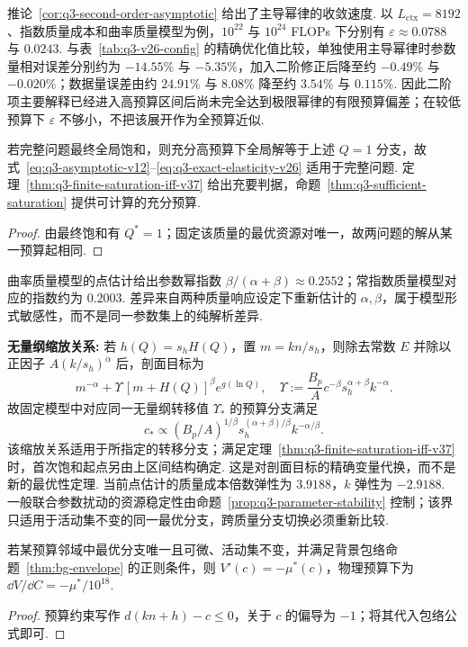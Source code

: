 推论~\ref{cor:q3-second-order-asymptotic} 给出了主导幂律的收敛速度. 以 $L_{\mathrm{ctx}}=8192$、指数质量成本和曲率质量模型为例，$10^{22}$ 与 $10^{24}$ FLOPs 下分别有 $\varepsilon\approx0.0788$ 与 $0.0243$. 与表~\ref{tab:q3-v26-config} 的精确优化值比较，单独使用主导幂律时参数量相对误差分别约为 $-14.55\%$ 与 $-5.35\%$，加入二阶修正后降至约 $-0.49\%$ 与 $-0.020\%$；数据量误差由约 $24.91\%$ 与 $8.08\%$ 降至约 $3.54\%$ 与 $0.115\%$. 因此二阶项主要解释已经进入高预算区间后尚未完全达到极限幂律的有限预算偏差；在较低预算下 $\varepsilon$ 不够小，不把该展开作为全预算近似. 

\begin{corollary}[完整问题的条件渐近]\label{cor:q3-global-asymptotic-v29}
若完整问题最终全局饱和，则充分高预算下全局解等于上述 $Q=1$ 分支，故式~\eqref{eq:q3-asymptotic-v12}--\eqref{eq:q3-exact-elasticity-v26} 适用于完整问题. 定理~\ref{thm:q3-finite-saturation-iff-v37} 给出充要判据，命题~\ref{thm:q3-sufficient-saturation} 提供可计算的充分预算. 
\end{corollary}
\begin{proof}
由最终饱和有 $Q^*=1$；固定该质量的最优资源对唯一，故两问题的解从某一预算起相同. 
\end{proof}
曲率质量模型的点估计给出参数幂指数 $\beta/(\alpha+\beta)\approx0.2552$；常指数质量模型对应的指数约为 $0.2003$. 差异来自两种质量响应设定下重新估计的 $\alpha,\beta$，属于模型形式敏感性，而不是同一参数集上的纯解析差异. 

\textbf{无量纲缩放关系:}
若 $h(Q)=s_hH(Q)$，置 $m=kn/s_h$，则除去常数 $E$ 并除以正因子 $A(k/s_h)^\alpha$ 后，剖面目标为
\begin{equation}\label{eq:q3-dimensionless-scaling}
m^{-\alpha}+\Upsilon\,[m+H(Q)]^\beta e^{g(\ln Q)},
\quad \Upsilon:=\frac{B_p}{A}c^{-\beta}s_h^{\alpha+\beta}k^{-\alpha}.
\end{equation}
故固定模型中对应同一无量纲转移值 $\Upsilon_*$ 的预算分支满足
\[
c_*\propto (B_p/A)^{1/\beta}s_h^{(\alpha+\beta)/\beta}k^{-\alpha/\beta}.
\]
该缩放关系适用于所指定的转移分支；满足定理~\ref{thm:q3-finite-saturation-iff-v37} 时，首次饱和起点另由上区间结构确定. 
这是对剖面目标的精确变量代换，而不是新的最优性定理. 
当前点估计的质量成本倍数弹性为 $3.9188$，$k$ 弹性为 $-2.9188$. 一般联合参数扰动的资源稳定性由命题~\ref{prop:q3-parameter-stability} 控制；该界只适用于活动集不变的同一最优分支，跨质量分支切换必须重新比较. 

\begin{corollary}[最优值的预算灵敏度与影子价格]\label{prop:q3-shadow-price}
若某预算邻域中最优分支唯一且可微、活动集不变，并满足背景包络命题~\ref{thm:bg-envelope} 的正则条件，则 $V'(c)=-\mu^*(c)$，物理预算下为 $\dd V/\dd C=-\mu^*/10^{18}$. 
\end{corollary}
\begin{proof}
预算约束写作 $d(kn+h)-c\le0$，关于 $c$ 的偏导为 $-1$；将其代入包络公式即可. 
\end{proof}

